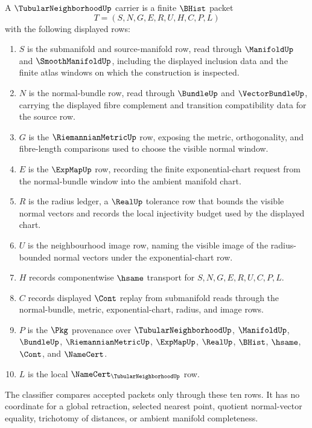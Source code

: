 \begin{definition}
\label{def:tubular-neighborhood-carrier}
A $\TubularNeighborhoodUp$ carrier is a finite $\BHist$ packet
$$
T=(S,N,G,E,R,U,H,C,P,L)
$$
with the following displayed rows:
\begin{enumerate}
\item $S$ is the submanifold and source-manifold row, read through $\ManifoldUp$ and $\SmoothManifoldUp$, including the displayed inclusion data and the finite atlas windows on which the construction is inspected.
\item $N$ is the normal-bundle row, read through $\BundleUp$ and $\VectorBundleUp$, carrying the displayed fibre complement and transition compatibility data for the source row.
\item $G$ is the $\RiemannianMetricUp$ row, exposing the metric, orthogonality, and fibre-length comparisons used to choose the visible normal window.
\item $E$ is the $\ExpMapUp$ row, recording the finite exponential-chart request from the normal-bundle window into the ambient manifold chart.
\item $R$ is the radius ledger, a $\RealUp$ tolerance row that bounds the visible normal vectors and records the local injectivity budget used by the displayed chart.
\item $U$ is the neighbourhood image row, naming the visible image of the radius-bounded normal vectors under the exponential-chart row.
\item $H$ records componentwise $\hsame$ transport for $S,N,G,E,R,U,C,P,L$.
\item $C$ records displayed $\Cont$ replay from submanifold reads through the normal-bundle, metric, exponential-chart, radius, and image rows.
\item $P$ is the $\Pkg$ provenance over $\TubularNeighborhoodUp$, $\ManifoldUp$, $\BundleUp$, $\RiemannianMetricUp$, $\ExpMapUp$, $\RealUp$, $\BHist$, $\hsame$, $\Cont$, and $\NameCert$.
\item $L$ is the local $\NameCert_{\TubularNeighborhoodUp}$ row.
\end{enumerate}
The classifier compares accepted packets only through these ten rows. It has no coordinate for a global retraction, selected nearest point, quotient normal-vector equality, trichotomy of distances, or ambient manifold completeness.
\end{definition}

